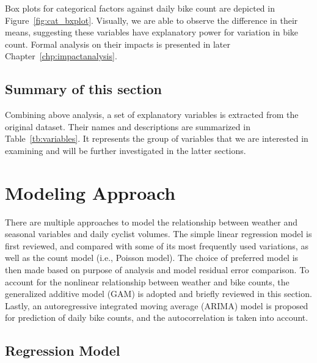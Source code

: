 \documentclass [11pt, proquest] {uwthesis}[2015/03/03]
\begin{document}
Box plots for categorical factors against daily bike count are depicted in Figure~\ref{fig:cat_bxplot}. Visually, we are able to observe the difference in their means, suggesting these variables have explanatory power for variation in bike count. Formal analysis on their impacts is presented in later Chapter~\ref{chp:impactanalysis}.

\subsection{Summary of this section}

Combining above analysis, a set of explanatory variables is extracted from the original dataset. Their names and descriptions are summarized in Table~\ref{tb:variables}. It represents the group of variables that we are interested in examining and will be further investigated in the latter sections. 


\section{Modeling Approach}
\label{sec:modelApproach}

There are multiple approaches to model the relationship between weather and seasonal variables and daily cyclist volumes. The simple linear regression model is first reviewed, and compared with some of its most frequently used variations, as well as the count model (i.e., Poisson model). The choice of preferred model is then made based on purpose of analysis and model residual error comparison. To account for the nonlinear relationship between weather and bike counts, the generalized additive model (GAM) is adopted and briefly reviewed in this section. Lastly, an autoregressive integrated moving average (ARIMA) model is proposed for prediction of daily bike counts, and the autocorrelation is taken into account. 

\subsection{Regression Model}
\end{document}
